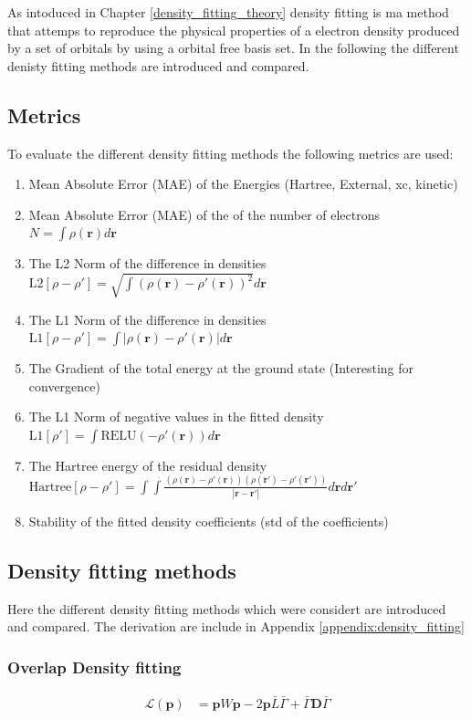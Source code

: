As intoduced in Chapter \ref{density_fitting_theory}
density fitting is ma method that attemps to reproduce the physical properties of a electron density produced by a set of orbitals by using a orbital free basis set.
In the following the different denisty fitting methods are introduced and compared.
\subsection{Metrics}
To evaluate the different density fitting methods the following metrics are used:
\begin{enumerate}
    \item Mean Absolute Error (MAE) of the Energies (Hartree, External, xc, kinetic)
    \item Mean Absolute Error (MAE) of the of the number of electrons $N = \int \rho(\mathbf{r}) d\mathbf{r}$
    \item The L2 Norm of the difference in densities $\text{L2}[\rho-\rho'] = \sqrt{\int (\rho(\mathbf{r})-\rho'(\mathbf{r}))^2} d\mathbf{r}$
    \item The L1 Norm of the difference in densities $\text{L1}[\rho-\rho'] = \int |\rho(\mathbf{r})-\rho'(\mathbf{r})| d\mathbf{r}$
    \item The Gradient of the total energy at the ground state (Interesting for convergence)
    \item The L1 Norm of negative values in the fitted density $\text{L1}[\rho'] = \int \text{RELU}(-\rho'(\mathbf{r})) d\mathbf{r}$
    \item The Hartree energy of the residual density $\text{Hartree}[\rho-\rho'] = \int \int \frac{(\rho(\mathbf{r})-\rho'(\mathbf{r}))(\rho(\mathbf{r'})-\rho'(\mathbf{r'}))}{|\mathbf{r}-\mathbf{r'}|}d\mathbf{r}d\mathbf{r'}$
    \item Stability of the fitted density coefficients (std of the coefficients)
\end{enumerate}
\subsection{Density fitting methods}
Here the different density fitting methods which were considert are introduced and compared.
The derivation are include in Appendix \ref{appendix:density_fitting}
\subsubsection{Overlap Density fitting}
\begin{align}
        \mathcal{L}(\mathbf{p}) &= \mathbf{p} W \mathbf{p} - 2 \mathbf{p}\bar { L} \bar\Gamma + \bar\Gamma \mathbf{D}\bar\Gamma
\end{align}

